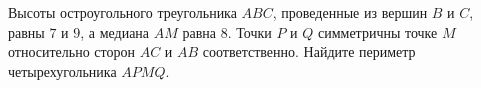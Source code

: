 \begin{ex}
	\begin{condition}
		Высоты остроугольного треугольника \( ABC \), проведенные из вершин \( B  \) и \( C \), равны \( 7  \) и \( 9 \), а медиана \( AM  \) равна \( 8 \). Точки \( P  \) и \( Q  \) симметричны точке \( M  \) относительно сторон \( AC  \) и \( AB \) соответственно. Найдите периметр четырехугольника \( APMQ \).
	\end{condition}
\end{ex}